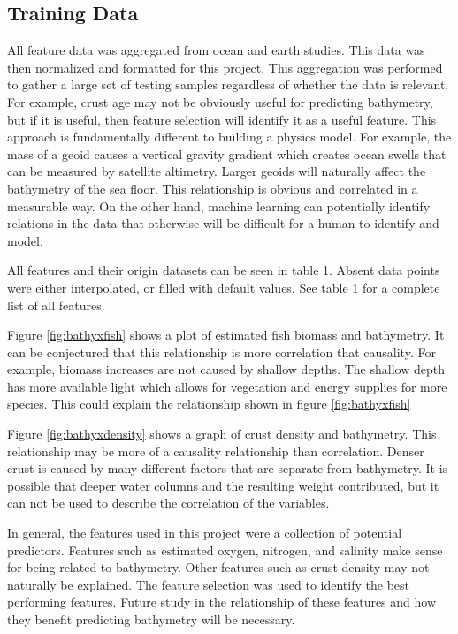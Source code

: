 \subsection{Training Data}
All feature data was aggregated from ocean and earth studies.
This data was then normalized and formatted for this project.
This aggregation was performed to gather a large set of testing samples regardless of whether the data is relevant.
For example, crust age may not be obviously useful for predicting bathymetry, but if it is useful, then feature selection will identify it as a useful feature.
This approach is fundamentally different to building a physics model.
For example, the mass of a geoid causes a vertical gravity gradient which creates ocean swells that can be measured by satellite altimetry.
Larger geoids will naturally affect the bathymetry of the sea floor.
This relationship is obvious and correlated in a measurable way.
On the other hand, machine learning can potentially identify relations in the data that otherwise will be difficult for a human to identify and model.

All features and their origin datasets can be seen in table 1. %
Absent data points were either interpolated, or filled with default values.
See table 1 for a complete list of all features.

\par
Figure \ref{fig:bathyxfish} shows a plot of estimated fish biomass and bathymetry.
It can be conjectured that this relationship is more correlation that causality.
For example, biomass increases are not caused by shallow depths.
The shallow depth has more available light which allows for vegetation and energy supplies for more species.
This could explain the relationship shown in figure \ref{fig:bathyxfish}

\par
Figure \ref{fig:bathyxdensity} shows a graph of crust density and bathymetry.
This relationship may be more of a causality relationship than correlation.
Denser crust is caused by many different factors that are separate from bathymetry.
It is possible that deeper water columns and the resulting weight contributed, but it can not be used to describe the correlation of the variables.

\par
In general, the features used in this project were a collection of potential predictors.
Features such as estimated oxygen, nitrogen, and salinity make sense for being related to bathymetry.
Other features such as crust density may not naturally be explained.
The feature selection was used to identify the best performing features.
Future study in the relationship of these features and how they benefit predicting bathymetry will be necessary.

